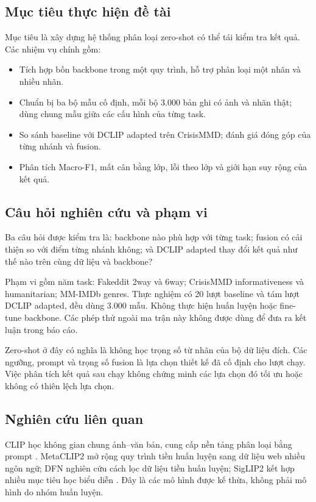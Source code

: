 \documentclass[12pt,a4paper]{article}
\begin{document}
\subsection{Mục tiêu thực hiện đề tài}
Mục tiêu là xây dựng hệ thống phân loại zero-shot có thể tái kiểm tra kết quả. Các nhiệm vụ chính gồm:
\begin{itemize}
\item Tích hợp bốn backbone trong một quy trình, hỗ trợ phân loại một nhãn và nhiều nhãn.
\item Chuẩn bị ba bộ mẫu cố định, mỗi bộ 3.000 bản ghi có ảnh và nhãn thật; dùng chung mẫu giữa các cấu hình của từng task.
\item So sánh baseline với DCLIP adapted trên CrisisMMD; đánh giá đóng góp của từng nhánh và fusion.
\item Phân tích Macro-F1, mất cân bằng lớp, lỗi theo lớp và giới hạn suy rộng của kết quả.
\end{itemize}

\subsection{Câu hỏi nghiên cứu và phạm vi}
Ba câu hỏi được kiểm tra là: backbone nào phù hợp với từng task; fusion có cải thiện so với điểm từng nhánh không; và DCLIP adapted thay đổi kết quả như thế nào trên cùng dữ liệu và backbone?

Phạm vi gồm năm task: Fakeddit 2way và 6way; CrisisMMD informativeness và humanitarian; MM-IMDb genres. Thực nghiệm có 20 lượt baseline và tám lượt DCLIP adapted, đều dùng 3.000 mẫu. Không thực hiện huấn luyện hoặc fine-tune backbone. Các phép thử ngoài ma trận này không được dùng để đưa ra kết luận trong báo cáo.

Zero-shot ở đây có nghĩa là không học trọng số từ nhãn của bộ dữ liệu đích. Các ngưỡng, prompt và trọng số fusion là lựa chọn thiết kế đã cố định cho lượt chạy. Việc phân tích kết quả sau chạy không chứng minh các lựa chọn đó tối ưu hoặc không có thiên lệch lựa chọn.

\subsection{Nghiên cứu liên quan}
CLIP học không gian chung ảnh--văn bản, cung cấp nền tảng phân loại bằng prompt \cite{clip}. MetaCLIP2 mở rộng quy trình tiền huấn luyện sang dữ liệu web nhiều ngôn ngữ; DFN nghiên cứu cách lọc dữ liệu tiền huấn luyện; SigLIP2 kết hợp nhiều mục tiêu học biểu diễn \cite{metaclip2,dfn,siglip2}. Đây là các mô hình được kế thừa, không phải mô hình do nhóm huấn luyện.
\end{document}

